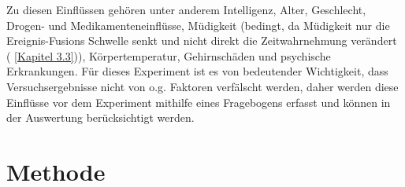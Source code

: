 \documentclass{Paper}
\begin{document}
Zu diesen Einflüssen gehören unter anderem Intelligenz, Alter, Geschlecht, Drogen- und Medikamenteneinflüsse, Müdigkeit (bedingt, da Müdigkeit nur die Ereignis-Fusions Schwelle senkt und nicht direkt die Zeitwahrnehmung verändert ( \ref {Kapitel 3.3})), Körpertemperatur, Gehirnschäden und psychische Erkrankungen.
Für dieses Experiment ist es von bedeutender Wichtigkeit, dass Versuchsergebnisse nicht von o.g. Faktoren verfälscht werden, daher werden diese Einflüsse vor dem Experiment mithilfe eines Fragebogens erfasst und können in der Auswertung berücksichtigt werden.




\section{Methode}
\end{document}
